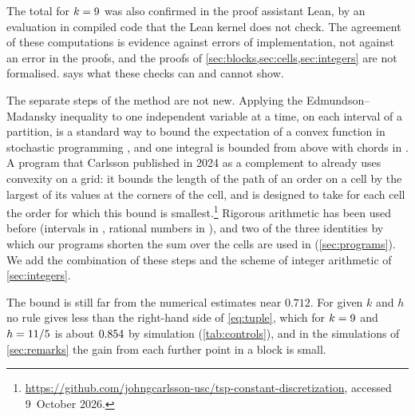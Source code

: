  The total for $k=9$ was also confirmed in the proof assistant Lean, by an evaluation in compiled code that the Lean kernel does not check. The agreement of these computations is evidence against errors of implementation, not against an error in the proofs, and the proofs of \cref{sec:blocks,sec:cells,sec:integers} are not formalised.  says what these checks can and cannot show.

The separate steps of the method are not new. Applying the Edmundson--Madansky inequality to one independent variable at a time, on each interval of a partition, is a standard way to bound the expectation of a convex function in stochastic programming \cite{KallWallace1994,HuangZiembaBenTal1977}, and one integral is bounded from above with chords in \cite[Remark~6]{YuCarlsson2023}. A program that Carlsson published in 2024 as a complement to \cite{CarlssonYu2026,YuCarlsson2023} already uses convexity on a grid: it bounds the length of the path of an order on a cell by the largest of its values at the corners of the cell, and is designed to take for each cell the order for which this bound is smallest.\footnote{\url{https://github.com/johngcarlsson-usc/tsp-constant-discretization}, accessed 9~October 2026.} Rigorous arithmetic has been used before (intervals in \cite{YuCarlsson2023}, rational numbers in \cite{DongCao2026}), and two of the three identities by which our programs shorten the sum over the cells are used in \cite{DongCao2026} (\cref{sec:programs}). We add the combination of these steps and the scheme of integer arithmetic of \cref{sec:integers}.

The bound is still far from the numerical estimates near $0.712$. For given $k$ and $h$ no rule gives less than the right-hand side of \eqref{eq:tuple}, which for $k=9$ and $h=11/5$ is about $0.854$ by simulation (\cref{tab:controls}), and in the simulations of \cref{sec:remarks} the gain from each further point in a block is small.

